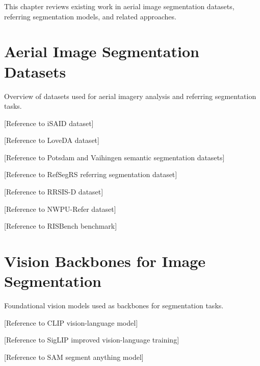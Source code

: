 \cleardoublepage
\label{chap:architecture}

This chapter reviews existing work in aerial image segmentation datasets, referring segmentation models, and related approaches.

\section{Aerial Image Segmentation Datasets}

Overview of datasets used for aerial imagery analysis and referring segmentation tasks.

[Reference to iSAID dataset] \cite{placeholder_isaid}

[Reference to LoveDA dataset] \cite{placeholder_loveda}

[Reference to Potsdam and Vaihingen semantic segmentation datasets] \cite{placeholder_potsdam} \cite{placeholder_vaihingen}

[Reference to RefSegRS referring segmentation dataset] \cite{placeholder_refsegrs}

[Reference to RRSIS-D dataset] \cite{placeholder_rrsisд}

[Reference to NWPU-Refer dataset] \cite{placeholder_nwpu}

[Reference to RISBench benchmark] \cite{placeholder_risbench}

\section{Vision Backbones for Image Segmentation}

Foundational vision models used as backbones for segmentation tasks.

[Reference to CLIP vision-language model] \cite{placeholder_clip}

[Reference to SigLIP improved vision-language training] \cite{placeholder_siglip}

[Reference to SAM segment anything model] \cite{placeholder_sam}

